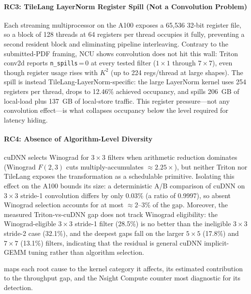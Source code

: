 \paragraph{RC3: TileLang LayerNorm Register Spill (Not a Convolution Problem)}
Each streaming multiprocessor on the A100 exposes a 65{,}536 32-bit register file, so a block of 128 threads at 64 registers per thread occupies it fully, preventing a second resident block and eliminating pipeline interleaving.
Contrary to the submitted-PDF framing, NCU shows convolution does not hit this wall: Triton conv2d reports \texttt{n\_spills}\,=\,0 at every tested filter ($1\times1$ through $7\times7$), even though register usage rises with $K^2$ (up to 224 regs/thread at large shapes).
The spill is instead TileLang-LayerNorm-specific: the large LayerNorm kernel uses 254 registers per thread, drops to 12.46\% achieved occupancy, and spills 206~GB of local-load plus 137~GB of local-store traffic.
This register pressure---not any convolution effect---is what collapses occupancy below the level required for latency hiding.

\label{sec:analysis:algo}
\paragraph{RC4: Absence of Algorithm-Level Diversity}
cuDNN selects Winograd for $3\times3$ filters when arithmetic reduction dominates (Winograd $F(2,3)$ cuts multiply-accumulates ${\approx}2.25\times$), but neither Triton nor TileLang exposes the transformation as a schedulable primitive.
Isolating this effect on the A100 bounds its size: a deterministic A/B comparison of cuDNN on $3\times3$ stride-1 convolution differs by only 0.03\% (a ratio of 0.9997), so absent Winograd selection accounts for at most ${\approx}2$--$3\%$ of the gap.
Moreover, the measured Triton-vs-cuDNN gap does not track Winograd eligibility: the Winograd-eligible $3\times3$ stride-1 filter (28.5\%) is no better than the ineligible $3\times3$ stride-2 case (32.1\%), and the deepest gaps fall on the larger $5\times5$ (17.8\%) and $7\times7$ (13.1\%) filters, indicating that the residual is general cuDNN implicit-GEMM tuning rather than algorithm selection.

\label{sec:analysis:summary}

 maps each root cause to the kernel category it affects,
its estimated contribution to the throughput gap, and the Nsight Compute counter
most diagnostic for its detection.


